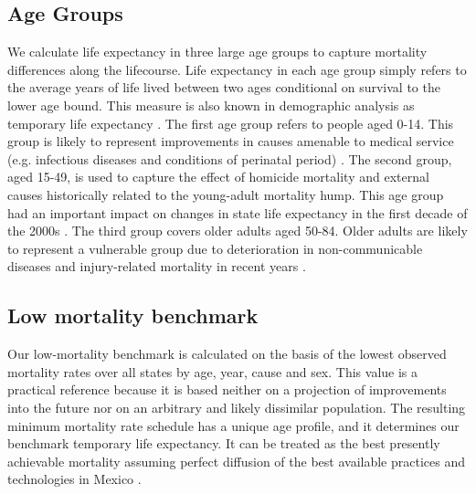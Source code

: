 \documentclass{bmcart}
\begin{document}




\subsection*{Age Groups}

We calculate life expectancy in three large age groups to capture mortality differences along the lifecourse. Life expectancy in each age group simply refers to the average years of life lived between two ages conditional on survival to the lower age bound. This measure is also known in demographic analysis as temporary life expectancy \cite{arriaga1984}. The first age group refers to people aged 0-14. This group is likely to represent improvements in causes amenable to medical service (e.g. infectious diseases and conditions of perinatal period) \cite{canudas2014}. The second group, aged 15-49, is used to capture the effect of homicide mortality and external causes historically related to the young-adult mortality hump. This age group had an important impact on changes in state life expectancy in the first decade of the 2000s \cite{Aburto2015}. The third group covers older adults aged 50-84. Older adults are likely to represent a vulnerable group due to deterioration in non-communicable diseases and injury-related mortality in recent years \cite{gomez2016dissonant,gonzalez2011health}.

\subsection*{Low mortality benchmark}
Our low-mortality benchmark is calculated on the basis of the lowest observed mortality rates over all states by age, year, cause and sex. This value is a practical reference because it is based neither on a projection of improvements into the future nor on an arbitrary and likely dissimilar population.  The resulting minimum mortality rate schedule has a unique age profile, and it determines our benchmark temporary life expectancy. It can be treated as the best presently achievable mortality assuming perfect diffusion of the best available practices and technologies in Mexico \cite{vallin2008minimum}. 
\end{document}

